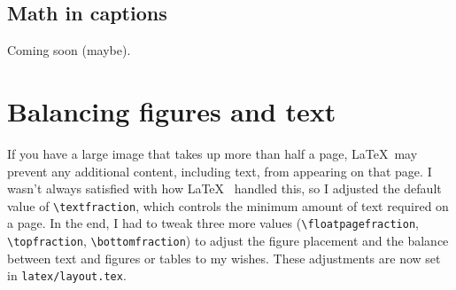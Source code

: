 \subsection{Math in captions}
Coming soon (maybe).

\section{Balancing figures and text}
If you have a large image that takes up more than half a page, \LaTeX~may prevent any additional content, including text, from appearing on that page. I wasn’t always satisfied with how \LaTeX~ handled this, so I adjusted the default value of \verb|\textfraction|, which controls the minimum amount of text required on a page. In the end, I had to tweak three more values (\verb|\floatpagefraction|, \verb|\topfraction|, \verb|\bottomfraction|) to adjust the figure placement and the balance between text and figures or tables to my wishes. These adjustments are now set in \verb|latex/layout.tex|.

